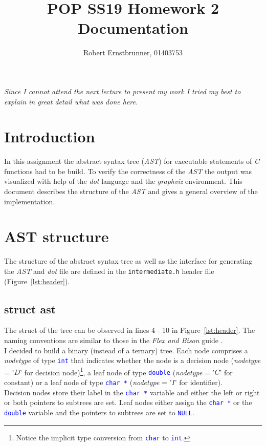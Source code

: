 \documentclass{scrartcl}
\title{POP SS19 Homework 2 Documentation}
\subtitle{Robert Ernstbrunner, 01403753}
\begin{document}
\maketitle

\textit{Since I cannot attend the next lecture to present my work I tried my best to explain in great detail what was done here.}

\section*{Introduction}

In this assignment the abstract syntax tree (\textit{AST}) for executable statements of \textit{C} functions had to be build. To verify the correctness of the \textit{AST} the output was visualized with help of the \textit{dot} language and the \textit{graphviz} environment. This document describes the structure of the \textit{AST} and gives a general overview of the implementation.

\section*{AST structure}
The structure of the abstract syntax tree as well as the interface for generating the \textit{AST} and \textit{dot} file are defined in the \texttt{intermediate.h} header file (Figure~\ref{lst:header}).\\

\subsection*{struct ast}
The struct of the tree can be observed in lines 4 - 10 in Figure~\ref{lst:header}. The naming conventions are similar to those in the \textit{Flex and Bison} guide \cite{bison}.\\
I decided to build a binary (instead of a ternary) tree. Each node comprises a \textit{nodetype} of type \texttt{\textcolor{blue}{int}} that indicates whether the node is a decision node (\textit{nodetype} = '$D$' for decision node)\footnote{Notice the implicit type conversion from \texttt{\textcolor{blue}{char}} to \texttt{\textcolor{blue}{int}}.}, a leaf node of type \texttt{\textcolor{blue}{double}} (\textit{nodetype} = '$C$' for constant) or a leaf node of type \texttt{\textcolor{blue}{char *}} (\textit{nodetype} = '$I$' for identifier).\\
Decision nodes store their label in the \texttt{\textcolor{blue}{char *}} variable and either the left or right or both pointers to subtrees are set. Leaf nodes either assign the \texttt{\textcolor{blue}{char *}} or the \texttt{\textcolor{blue}{double}} variable and the pointers to subtrees are set to \texttt{\textcolor{blue}{NULL}}.\\
\end{document}
